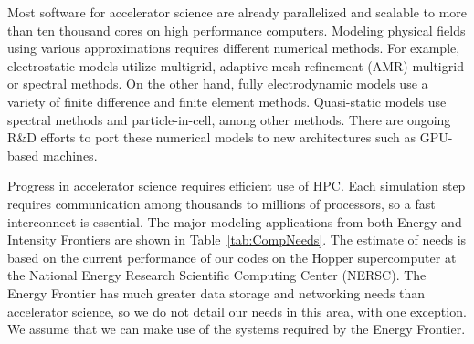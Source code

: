 Most software for accelerator science are already parallelized and scalable to 
more than ten thousand cores on high performance computers. 
Modeling physical fields using various approximations requires different 
numerical methods.  For example, electrostatic models utilize multigrid, 
adaptive mesh refinement (AMR) multigrid or spectral methods.
On the other hand, fully electrodynamic models use a variety of
finite difference and finite element methods.
Quasi-static models use spectral methods and particle-in-cell, among
other methods.
There are ongoing R\&D efforts to port these numerical models to new architectures such as GPU-based machines.

Progress in accelerator science requires efficient use of HPC.
Each simulation step requires communication among thousands to
millions of processors, so a fast interconnect is essential.
The major modeling applications from both Energy and Intensity
Frontiers are shown in Table~\ref{tab:CompNeeds}.  The estimate of needs is
based on the current performance of our codes on the Hopper supercomputer at
the National Energy Research Scientific Computing Center (NERSC). 
The Energy Frontier has much greater data storage and networking needs
than accelerator science, so we do not detail our needs in this area, with one
exception.  We assume that we can make use of the systems required by
the Energy Frontier.

